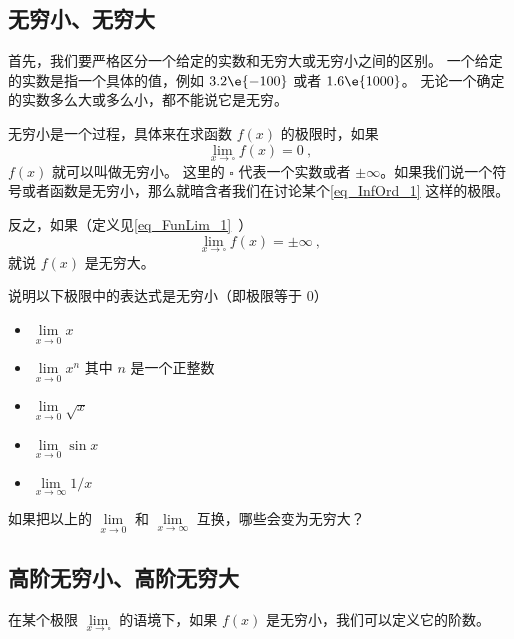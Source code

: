 
\begin{issues}
\issueTODO
\end{issues}


\subsection{无穷小、无穷大}
首先，我们要严格区分一个给定的实数和无穷大或无穷小之间的区别。 一个给定的实数是指一个具体的值，例如 $3.2\e{-100}$ 或者 $1.6\e{1000}$。 无论一个确定的实数多么大或多么小，都不能说它是无穷。

无穷小是一个过程，具体来在求函数 $f(x)$ 的极限时，如果
\begin{equation}\label{eq_InfOrd_1}
\lim_{x\to \square} f(x) = 0~,
\end{equation}
$f(x)$ 就可以叫做无穷小。 这里的 $\square$ 代表一个实数或者 $\pm\infty$。如果我们说一个符号或者函数是无穷小，那么就暗含者我们在讨论某个\autoref{eq_InfOrd_1} 这样的极限。

反之，如果（定义见\autoref{eq_FunLim_1}~）
\begin{equation}
\lim_{x\to \square} f(x) = \pm\infty~,
\end{equation}
就说 $f(x)$ 是无穷大。

\begin{exercise}{}
说明以下极限中的表达式是无穷小（即极限等于 0）
\begin{itemize}
\item $\lim\limits_{x\to 0} x$
\item $\lim\limits_{x\to 0} x^n$ 其中 $n$ 是一个正整数
\item $\lim\limits_{x\to 0} \sqrt{x}$
\item $\lim\limits_{x\to 0} \sin x$
\item $\lim\limits_{x\to \infty} 1/x$
\end{itemize}
如果把以上的 $\lim\limits_{x\to 0}$ 和 $\lim\limits_{x\to \infty}$ 互换，哪些会变为无穷大？
\end{exercise}

\subsection{高阶无穷小、高阶无穷大}
在某个极限 $\lim\limits_{x\to \square}$ 的语境下，如果 $f(x)$ 是无穷小，我们可以定义它的阶数。

